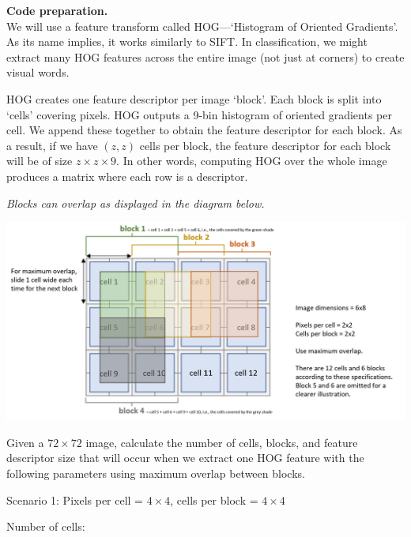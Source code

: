 \documentclass{csci1430}
\begin{document}
\pagebreak
\begin{question}[points=10,drawbox=false] 
\textbf{Code preparation.}\\
We will use a feature transform called HOG---`Histogram of Oriented Gradients'. As its name implies, it works similarly to SIFT. In classification, we might extract many HOG features across the entire image (not just at corners) to create visual words.

HOG creates one feature descriptor per image `block'. Each block is split into `cells' covering pixels. HOG outputs a 9-bin histogram of oriented gradients per cell. We append these together to obtain the feature descriptor for each block. As a result, if we have $(z,z)$ cells per block, the feature descriptor for each block will be of size $z \times z \times 9$. In other words, computing HOG over the whole image produces a matrix where each row is a descriptor. 

\emph{Blocks can overlap as displayed in the diagram below.}

\begin{center}
    \includegraphics[width=\linewidth]{images/hog-diagram.png}
\end{center}
\end{question}


\pagebreak
Given a $72\times72$ image, calculate the number of cells, blocks, and feature descriptor size that will occur when we extract one HOG feature with the following parameters using maximum overlap between blocks.

\begin{subquestion}[points=3]
Scenario 1: Pixels per cell = $4\times4$, cells per block = $4\times4$ \end{subquestion}

\begin{answer}
Number of cells:
\end{answer} 
\end{document}
